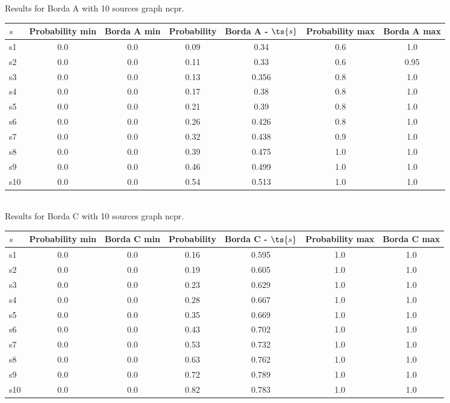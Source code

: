 \documentclass{article}
\begin{document}
\noindent Results for Borda A with 10 sources graph ncpr.

\noindent\begin{tabular}{|l|c|c|c|c|c|c|}
\hline
$s$& Probability min & Borda A min & Probability & Borda A - $\ts{s}$ & Probability max & Borda A max\\
\hline
s1 &0.0 & 0.0 & 0.09 & 0.34 & 0.6 & 1.0\\
\hline
s2 &0.0 & 0.0 & 0.11 & 0.33 & 0.6 & 0.95\\
\hline
s3 &0.0 & 0.0 & 0.13 & 0.356 & 0.8 & 1.0\\
\hline
s4 &0.0 & 0.0 & 0.17 & 0.38 & 0.8 & 1.0\\
\hline
s5 &0.0 & 0.0 & 0.21 & 0.39 & 0.8 & 1.0\\
\hline
s6 &0.0 & 0.0 & 0.26 & 0.426 & 0.8 & 1.0\\
\hline
s7 &0.0 & 0.0 & 0.32 & 0.438 & 0.9 & 1.0\\
\hline
s8 &0.0 & 0.0 & 0.39 & 0.475 & 1.0 & 1.0\\
\hline
s9 &0.0 & 0.0 & 0.46 & 0.499 & 1.0 & 1.0\\
\hline
s10 &0.0 & 0.0 & 0.54 & 0.513 & 1.0 & 1.0\\
\hline
\end{tabular}\\

\noindent Results for Borda C with 10 sources graph ncpr.

\noindent\begin{tabular}{|l|c|c|c|c|c|c|}
\hline
$s$& Probability min & Borda C min & Probability & Borda C - $\ts{s}$ & Probability max & Borda C max\\
\hline
s1 &0.0 & 0.0 & 0.16 & 0.595 & 1.0 & 1.0\\
\hline
s2 &0.0 & 0.0 & 0.19 & 0.605 & 1.0 & 1.0\\
\hline
s3 &0.0 & 0.0 & 0.23 & 0.629 & 1.0 & 1.0\\
\hline
s4 &0.0 & 0.0 & 0.28 & 0.667 & 1.0 & 1.0\\
\hline
s5 &0.0 & 0.0 & 0.35 & 0.669 & 1.0 & 1.0\\
\hline
s6 &0.0 & 0.0 & 0.43 & 0.702 & 1.0 & 1.0\\
\hline
s7 &0.0 & 0.0 & 0.53 & 0.732 & 1.0 & 1.0\\
\hline
s8 &0.0 & 0.0 & 0.63 & 0.762 & 1.0 & 1.0\\
\hline
s9 &0.0 & 0.0 & 0.72 & 0.789 & 1.0 & 1.0\\
\hline
s10 &0.0 & 0.0 & 0.82 & 0.783 & 1.0 & 1.0\\
\hline
\end{tabular}\\
\end{document}
